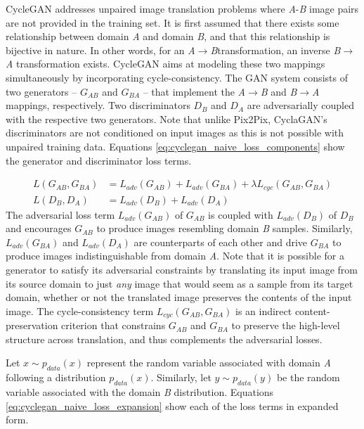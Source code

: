 CycleGAN addresses unpaired image translation problems where \textit{A}-\textit{B} image pairs are not provided in the training set. It is first assumed that there exists some relationship between domain \textit{A} and domain \textit{B}, and that this relationship is bijective in nature. In other words, for an \textit{A}$\rightarrow$\textit{B}transformation, an inverse \textit{B}$\rightarrow$\textit{A} transformation exists. CycleGAN aims at modeling these two mappings simultaneously by incorporating cycle-consistency. The GAN system consists of two generators -- $G_{AB}$ and $G_{BA}$ -- that implement the \textit{A}$\rightarrow$\textit{B} and \textit{B}$\rightarrow$\textit{A} mappings, respectively. Two discriminators $D_B$ and $D_A$ are adversarially coupled with the respective two generators. Note that unlike Pix2Pix, CyclaGAN's discriminators are not conditioned on input images as this is not possible with unpaired training data. Equations \ref{eq:cyclegan_naive_loss_components} show the generator and discriminator loss terms.

\begin{equation}
    \begin{aligned}
    L(G_{AB}, G_{BA}) &= L_{adv}(G_{AB}) + L_{adv}(G_{BA}) + \lambda L_{cyc}(G_{AB}, G_{BA}) \\[1mm]
    L(D_B, D_A) &= L_{adv}(D_B) + L_{adv}(D_A)
    \end{aligned}
    \label{eq:cyclegan_naive_loss_components}
\end{equation}
The adversarial loss term $L_{adv}(G_{AB})$ of $G_{AB}$ is coupled with $L_{adv}(D_B)$ of $D_B$ and encourages $G_{AB}$ to produce images resembling domain \textit{B} samples. Similarly, $L_{adv}(G_{BA})$ and $L_{adv}(D_A)$ are counterparts of each other and drive $G_{BA}$ to produce images indistinguishable from domain \textit{A}. Note that it is possible for a generator to satisfy its adversarial constraints by translating its input image from its source domain to just \textit{any} image that would seem as a sample from its target domain, whether or not the translated image preserves the contents of the input image. The cycle-consistency term $L_{cyc}(G_{AB}, G_{BA})$ is an indirect content-preservation criterion that constrains $G_{AB}$ and $G_{BA}$ to preserve the high-level structure across translation, and thus complements the adversarial losses. 

Let $x \sim p_{data}(x)$ represent the random variable associated with domain \textit{A} following a distribution $p_{data}(x)$. Similarly, let $y \sim p_{data}(y)$ be the random variable associated with the domain \textit{B} distribution. Equations \ref{eq:cyclegan_naive_loss_expansion} show each of the loss terms in expanded form.

